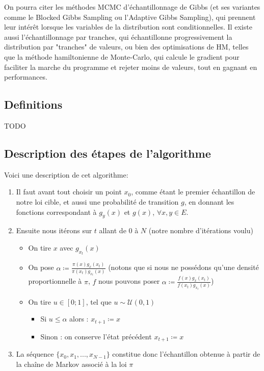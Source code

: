 \documentclass{article}
\begin{document}
On pourra citer les méthodes MCMC d'échantillonnage de Gibbs (et ses variantes comme le Blocked Gibbs Sampling ou l'Adaptive Gibbs Sampling), qui prennent leur intérêt lorsque les variables de la distribution sont conditionnelles. Il existe aussi l’échantillonnage par tranches, qui échantillonne progressivement la distribution par "tranches" de valeurs, ou bien des optimisations de HM, telles que la méthode hamiltonienne de Monte-Carlo, qui calcule le gradient pour faciliter la marche du programme et rejeter moins de valeurs, tout en gagnant en performances. \\

\subsection{Definitions}

TODO \\

\label{description-algo-hast-met}
\subsection{Description des étapes de l'algorithme}

Voici une description de cet algorithme:

\begin{enumerate}
\item Il faut avant tout choisir un point $x_0$, comme étant le premier échantillon de notre loi cible, et aussi une probabilité de transition $g$, en donnant les fonctions correspondant à $g_y(x)$ et $g(x)$, $\forall x,y \in E$.  

\item Ensuite nous itérons sur $t$ allant de 0 à $N$ (notre nombre d'itérations voulu)  \begin{itemize}
    \item On tire $x$ avec $g_{x_t}(x)$  
    \item On pose $\alpha \coloneqq \frac{ \pi(x) g_x(x_t)}{\pi(x_t) g_{x_t}(x)}$ (notons que si nous ne possédons qu'une densité proportionnelle à $\pi$, $f$ nous pouvons poser $\alpha \coloneqq \frac{ f(x) g_x(x_t)}{f(x_t) g_{x_t}(x)}$)  
    \item On tire $u \in [0;1]$, tel que $u  \sim \mathcal{U}(0,1)$  \begin{itemize}
        \item Si $u \leqslant \alpha$ alors : $x_{t+1} \coloneqq x$  
        \item Sinon : on conserve l'état précédent $x_{t+1} \coloneqq x$  
        \end{itemize}
    \end{itemize}
\item La séquence $\{x_0,x_1, ... ,x_{N-1}\}$ constitue donc l'échantillon obtenue à partir de la chaîne de Markov associé à la loi $\pi$
\end{enumerate}
\end{document}
